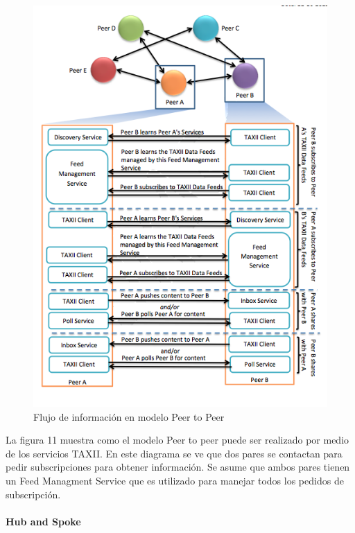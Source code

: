 \begin{figure}[ht!]
  \centering
  \includegraphics[scale=0.55]{./images/PeerToPeerModel.png}
    \caption{Flujo de información en modelo Peer to Peer \protect\cite{b1}}
\end{figure}

La figura 11 muestra como el modelo Peer to peer puede ser realizado por 
medio de los servicios TAXII. En este diagrama se ve que dos pares se contactan 
para pedir subscripciones para obtener información. Se asume que ambos pares 
tienen un Feed Managment Service que es utilizado para manejar todos los 
pedidos de subscripción.
\newpage

\paragraph{Hub and Spoke}

